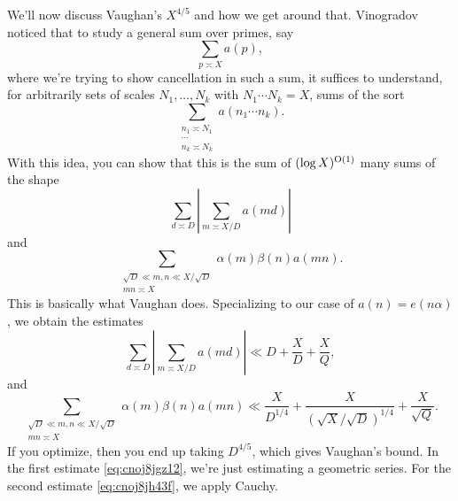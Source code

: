 \documentclass[reqno]{amsart} 
\begin{document}
We'll now discuss Vaughan's $X^{4/5}$ and how we get around that.  Vinogradov noticed that to study a general sum over primes, say
\begin{equation*}
  \sum_{p \asymp X}
  a(p),
\end{equation*}
where we're trying to show cancellation in such a sum, it suffices to understand, for arbitrarily sets of scales $N_1, \dotsc, N_k$ with $N_1 \dotsb N_k = X$, sums of the sort
\begin{equation*}
  \sum_{
    \substack{
      n_1 \asymp N_1  \\
      \dotsb \\
      n_k \asymp N_k
    }
  }
  a(n_1 \dotsb n_k).
\end{equation*}
With this idea, you can show that this is the sum of $(\log X)^{\operatorname{O}(1)}$ many sums of the shape
\begin{equation*}
  \sum_{d \asymp D}
  \left| \sum_{m \asymp X / D}
    a(m d)
  \right|
\end{equation*}
and
\begin{equation*}
  \sum_{
    \substack{
      \sqrt{D} \ll
      m, n
      \ll X / \sqrt{D}
      \\
      m n \asymp X      
    }
  }
  \alpha(m) \beta(n) a(m n).
\end{equation*}
This is basically what Vaughan does.  Specializing to our case of $a(n) = e(n \alpha)$, we obtain the estimates
\begin{equation}\label{eq:cnoj8jgz12}
  \sum_{d \asymp D}
  \left| \sum_{m \asymp X / D}
    a(m d)
  \right|
  \ll D + \frac{X}{D} + \frac{X}{Q},
\end{equation}
and
\begin{equation}\label{eq:cnoj8jh43f}
  \sum_{
    \substack{
      \sqrt{D} \ll
      m, n
      \ll X / \sqrt{D}
      \\
      m n \asymp X      
    }
  }
  \alpha(m) \beta(n) a(m n)
  \ll
  \frac{X}{ D^{1/4}}
  + \frac{X}{(\sqrt{X} / \sqrt{D})^{1/4}} +
  \frac{X}{ \sqrt{Q}}.
\end{equation}
If you optimize, then you end up taking $D^{4/5}$, which gives Vaughan's bound.  In the first estimate \eqref{eq:cnoj8jgz12}, we're just estimating a geometric series.  For the second estimate \eqref{eq:cnoj8jh43f}, we apply Cauchy.
\end{document}
